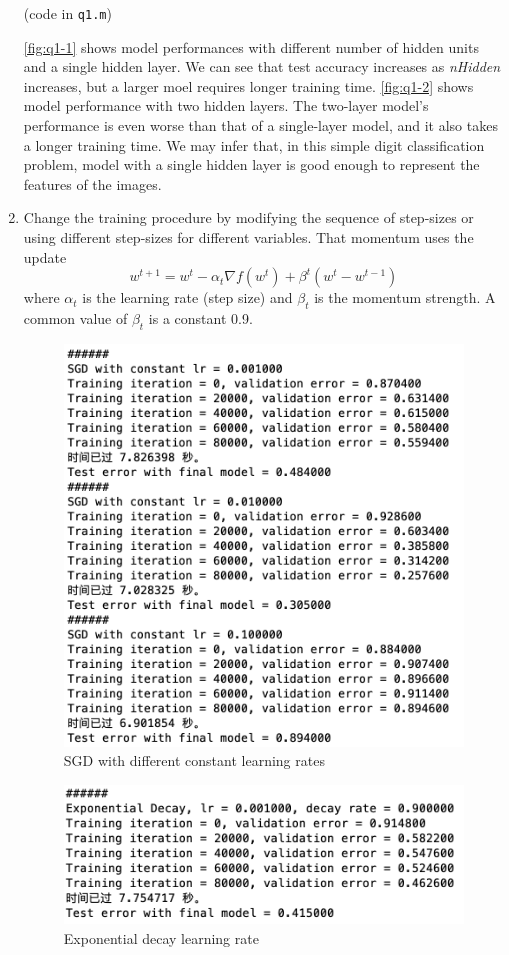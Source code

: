\documentclass[10pt]{article}
\begin{document}
\begin{enumerate}
(code in \texttt{q1.m})

\autoref{fig:q1-1} shows model performances with different number of hidden units and a single hidden layer. We can see that test accuracy increases as \textit{nHidden} increases, but a larger moel requires longer training time. \autoref{fig:q1-2} shows model performance with two hidden layers. The two-layer model's performance is even worse than that of a single-layer model, and it also takes a longer training time. We may infer that, in this simple digit classification problem, model with a single hidden layer is good enough to represent the features of the images. 


\item Change the training procedure by modifying the sequence of step-sizes or using different step-sizes for different variables. That momentum uses the update
$$
w^{t+1} = w^t - \alpha_t \nabla f(w^t) + \beta^t (w^t - w^{t-1})
$$
where $\alpha_t$ is the learning rate (step size) and $\beta_t$ is the momentum strength. A common value of $\beta_t$ is a constant 0.9.

\begin{figure}[htbp]
  \centering
  \includegraphics[width=0.5\linewidth]{figures/q2-1.png}
  \caption{SGD with different constant learning rates}
  \label{fig:q2-1}
\end{figure}

\begin{figure}[htbp]
  \centering
  \includegraphics[width=0.5\linewidth]{figures/q2-2.png}
  \caption{Exponential decay learning rate}
  \label{fig:q2-2}
\end{figure}


\end{enumerate}
\end{document}
